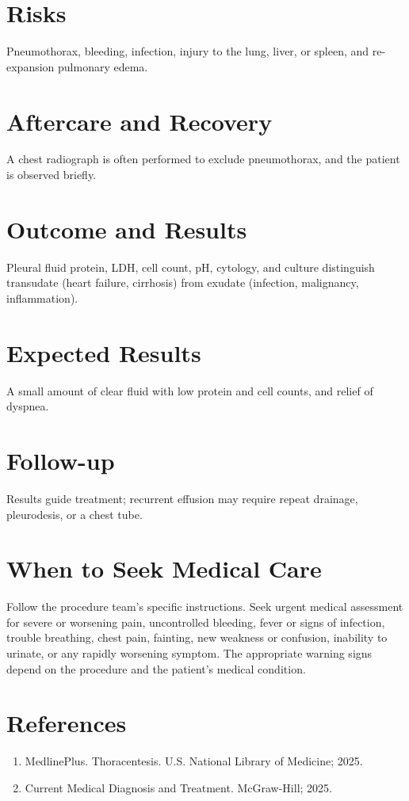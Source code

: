 \section*{Risks}
Pneumothorax, bleeding, infection, injury to the lung, liver, or spleen, and re-expansion pulmonary edema.

\section*{Aftercare and Recovery}
A chest radiograph is often performed to exclude pneumothorax, and the patient is observed briefly.

\section*{Outcome and Results}
Pleural fluid protein, LDH, cell count, pH, cytology, and culture distinguish transudate (heart failure, cirrhosis) from exudate (infection, malignancy, inflammation).

\section*{Expected Results}
A small amount of clear fluid with low protein and cell counts, and relief of dyspnea.

\section*{Follow-up}
Results guide treatment; recurrent effusion may require repeat drainage, pleurodesis, or a chest tube.

\section*{When to Seek Medical Care}
Follow the procedure team's specific instructions. Seek urgent medical assessment for severe or worsening pain, uncontrolled bleeding, fever or signs of infection, trouble breathing, chest pain, fainting, new weakness or confusion, inability to urinate, or any rapidly worsening symptom. The appropriate warning signs depend on the procedure and the patient's medical condition.

\section*{References}
\begin{enumerate}
  \item MedlinePlus. Thoracentesis. U.S. National Library of Medicine; 2025.
  \item Current Medical Diagnosis and Treatment. McGraw-Hill; 2025.
\end{enumerate}

\clearpage
